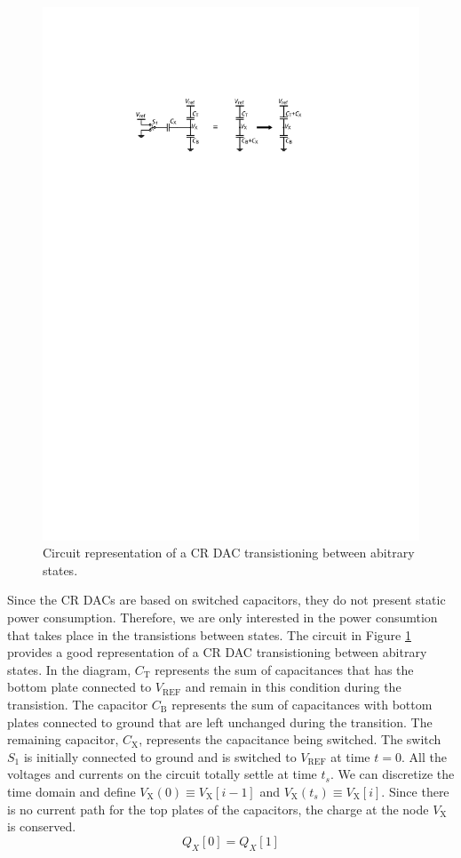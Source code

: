 \documentclass[]{article}
\newcommand{\figref}[1]{Figure \ref{#1}}
\newcommand{\vref}{\ensuremath{V_\mathrm{REF}}}
\begin{document}
\begin{figure}
	\centering
	\includegraphics[scale=1.0]{figures/capacitor_switch}
	\caption{Circuit representation of a CR DAC transistioning between abitrary states.}
	\label{fig:capacitor_switch}
\end{figure}

Since the CR DACs are based on switched capacitors, they do not present static power consumption. Therefore, we are only interested in the power consumtion that takes place in the transistions between states. The circuit in \figref{fig:capacitor_switch} provides a good representation of a CR DAC transistioning between abitrary states. In the diagram, $C_\mathrm{T}$ represents the sum of capacitances that has the bottom plate connected to $\vref$ and remain in this condition during the transistion. The capacitor $C_\mathrm{B}$ represents the sum of capacitances with bottom plates connected to ground that are left unchanged during the transition. The remaining capacitor, $C_\mathrm{X}$, represents the capacitance being switched. The switch $S_1$ is initially connected to ground and is switched to $\vref$ at time $t=0$. All the voltages and currents on the circuit totally settle at time $t_s$. We can discretize the time domain and define $V_\mathrm{X}(0) \equiv V_\mathrm{X}[i-1]$ and $V_\mathrm{X}(t_s) \equiv V_\mathrm{X}[i]$. Since there is no current path for the top plates of the capacitors, the charge at the node $V_\mathrm{X}$ is conserved.
\begin{equation}
	Q_X[0]=Q_X[1]
	\label{eq:q_conservation}
\end{equation}
\end{document}
